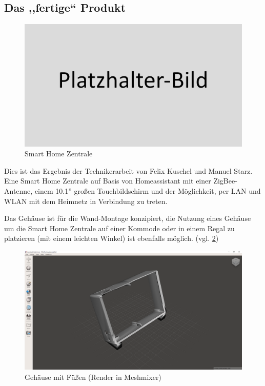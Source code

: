 \subsection{Das ,,fertige`` Produkt}\label{ku_produkt}
\begin{figure}[h!t]
	\includegraphics[width=1\textwidth]{img/placeholder.png}
	\caption[Smart Home Zentrale]{Smart Home Zentrale}
	\label{fig:smart-home-zentrale}
\end{figure}
\noindent Dies ist das Ergebnis der Technikerarbeit von Felix Kuschel und Manuel Starz. 
Eine Smart Home Zentrale auf Basis von Homeassistant mit einer ZigBee-Antenne, einem 10.1'' großen Touchbildschirm und der Möglichkeit, per LAN und WLAN mit dem Heimnetz in Verbindung zu treten.\par
\noindent Das Gehäuse ist für die Wand-Montage konzipiert, die Nutzung eines Gehäuse um die Smart Home Zentrale auf einer Kommode oder in einem Regal zu platzieren (mit einem leichten Winkel) ist ebenfalls möglich. (vgl. \ref{fig:case-with-feet})
\begin{figure}[h!tb]
	\includegraphics[width=1\textwidth]{img/stand_case.png}
	\caption[Gehäuse mit Füßen (Render in Meshmixer)]{Gehäuse mit Füßen (Render in Meshmixer)}
	\label{fig:case-with-feet}
\end{figure}